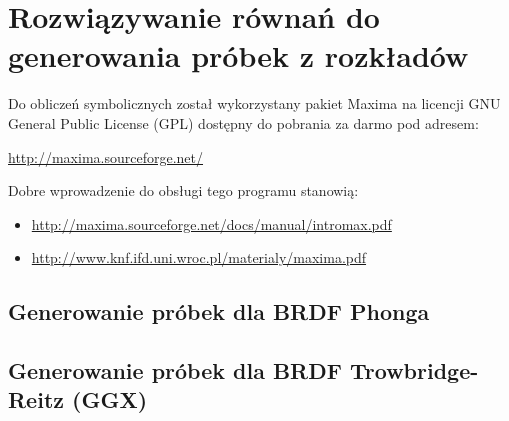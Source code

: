 \documentclass[../main.tex]{subfiles}
\begin{document}
\chapter{Rozwiązywanie równań do generowania próbek z rozkładów}
\label{appendix:maxima}

Do obliczeń symbolicznych został wykorzystany pakiet Maxima na licencji GNU
General Public License (GPL) dostępny do pobrania za darmo pod adresem:

\url{http://maxima.sourceforge.net/}

Dobre wprowadzenie do obsługi tego programu stanowią:
\begin{itemize}
\item \url{http://maxima.sourceforge.net/docs/manual/intromax.pdf}
\item \url{http://www.knf.ifd.uni.wroc.pl/materialy/maxima.pdf}
\end{itemize}

\section{Generowanie próbek dla BRDF Phonga}


\section{Generowanie próbek dla BRDF Trowbridge-Reitz (GGX)}

\end{document}
